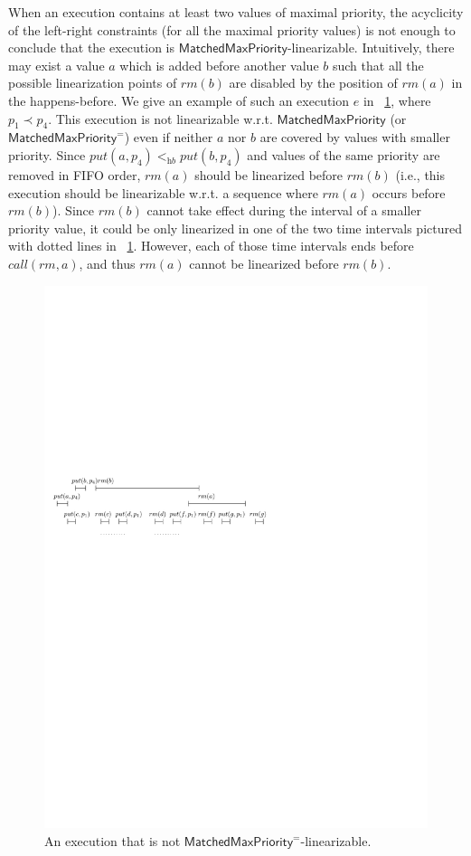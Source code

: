 \documentclass[a4paper,UKenglish]{lipics-v2016}
\begin{document}
When an execution contains at least two values of maximal priority, the acyclicity of the left-right constraints (for all the maximal priority values) is not enough to conclude that the execution is $\mathsf{MatchedMaxPriority}$-linearizable.
Intuitively, there may exist a value $a$ which is added before another value $b$ such that all the possible linearization points of $\textit{rm}(b)$ are disabled by the position of $\textit{rm}(a)$ in the happens-before. We give an example of such an execution $e$ in \figurename~\ref{fig:introduce pb order}, where $p_1\prec p_4$. This execution  is not linearizable w.r.t. $\mathsf{MatchedMaxPriority}$ (or $\mathsf{MatchedMaxPriority}^{=}$) even if
neither $a$ nor $b$ are covered by values with smaller priority. 
Since $\textit{put}(a,p_4) <_{\textit{hb}} \textit{put}(b,p_4)$ and values of the same priority are removed in FIFO order, $\textit{rm}(a)$ should be linearized before $\textit{rm}(b)$ (i.e., this execution should be linearizable w.r.t. a sequence where $\textit{rm}(a)$ occurs before $\textit{rm}(b)$).
Since $\textit{rm}(b)$ cannot take effect during the interval of a smaller priority value, it could be only linearized in one of the two time intervals pictured with dotted lines in \figurename~\ref{fig:introduce pb order}. However, each of those time intervals ends before $\textit{call}(\textit{rm},a)$, and thus $\textit{rm}(a)$ cannot be linearized before $\textit{rm}(b)$.

\begin{figure}[t]
  \centering
  \includegraphics[width=0.5 \textwidth]{PIC-HIS-INTRO-PB-ORDER-EPQ.pdf}
  \caption{An execution that is not $\mathsf{MatchedMaxPriority}^=$-linearizable.}
  \label{fig:introduce pb order}
\end{figure}
\end{document}
